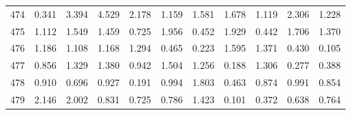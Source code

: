 \begin{tabular}{lrrrrrrrrrr}
474 &  0.341 &  3.394 &  4.529 &  2.178 &  1.159 &  1.581 &  1.678 &  1.119 &  2.306 &  1.228 \\
475 &  1.112 &  1.549 &  1.459 &  0.725 &  1.956 &  0.452 &  1.929 &  0.442 &  1.706 &  1.370 \\
476 &  1.186 &  1.108 &  1.168 &  1.294 &  0.465 &  0.223 &  1.595 &  1.371 &  0.430 &  0.105 \\
477 &  0.856 &  1.329 &  1.380 &  0.942 &  1.504 &  1.256 &  0.188 &  1.306 &  0.277 &  0.388 \\
478 &  0.910 &  0.696 &  0.927 &  0.191 &  0.994 &  1.803 &  0.463 &  0.874 &  0.991 &  0.854 \\
479 &  2.146 &  2.002 &  0.831 &  0.725 &  0.786 &  1.423 &  0.101 &  0.372 &  0.638 &  0.764 \\
\bottomrule
\end{tabular}
